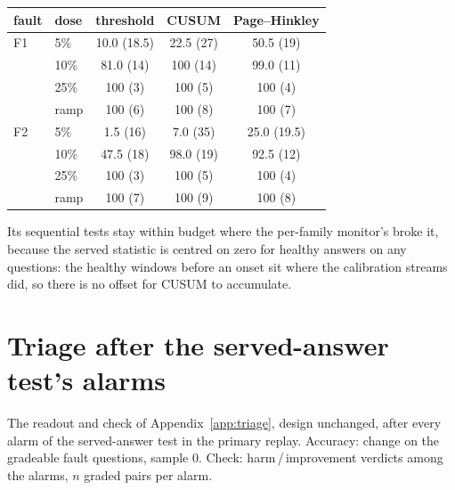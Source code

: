 \documentclass[11pt]{article}
\begin{document}
\begin{center}\small
\setlength{\tabcolsep}{3.4pt}
\begin{tabular}{llccc}
  \toprule
  fault & dose & threshold & CUSUM & Page--Hinkley \\
  \midrule
  F1 & 5\% & 10.0 (18.5) & 22.5 (27) & 50.5 (19) \\
     & 10\% & 81.0 (14) & 100 (14) & 99.0 (11) \\
     & 25\% & 100 (3) & 100 (5) & 100 (4) \\
     & ramp & 100 (6) & 100 (8) & 100 (7) \\
  F2 & 5\% & 1.5 (16) & 7.0 (35) & 25.0 (19.5) \\
     & 10\% & 47.5 (18) & 98.0 (19) & 92.5 (12) \\
     & 25\% & 100 (3) & 100 (5) & 100 (4) \\
     & ramp & 100 (7) & 100 (9) & 100 (8) \\
  \bottomrule
\end{tabular}
\end{center}

\noindent Its sequential tests stay within budget where the per-family monitor's
broke it, because the served statistic is centred on zero for healthy answers on
any questions: the healthy windows before an onset sit where the calibration
streams did, so there is no offset for CUSUM to accumulate.

\section{Triage after the served-answer test's alarms}
\label{app:triage2}

The readout and check of Appendix~\ref{app:triage}, design unchanged, after every
alarm of the served-answer test in the primary replay. Accuracy: change on the
gradeable fault questions, sample 0. Check: harm\,/\,improvement verdicts among the
alarms, $n$ graded pairs per alarm.
\end{document}
